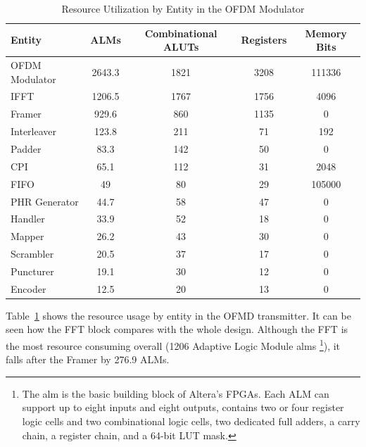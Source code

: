 \begin{table}[htb]\small
\centering
\caption{Resource Utilization by Entity in the OFDM Modulator}
\label{table:resource_entity_tx}
\begin{tabular}{lcccc}
\hline
Entity        & ALMs   & Combinational ALUTs & Registers & Memory Bits \\ \hline
OFDM Modulator       & 2643.3 & 1821                & 3208      & 111336      \\
IFFT          & 1206.5 & 1767                 &1756      & 4096        \\
Framer        & 929.6  & 860                 & 1135      & 0           \\
Interleaver   & 123.8  & 211                 & 71        & 192         \\
Padder        & 83.3   & 142                 & 50        & 0           \\
CPI           & 65.1   & 112                 & 31        & 2048        \\
FIFO          & 49     & 80                  & 29        & 105000      \\
PHR Generator & 44.7   & 58                  & 47        & 0           \\
Handler       & 33.9   & 52                  & 18        & 0           \\
Mapper        & 26.2   & 43                  & 30        & 0           \\
Scrambler     & 20.5   & 37                  & 17        & 0           \\
Puncturer     & 19.1   & 30                  & 12        & 0           \\
Encoder       & 12.5   & 20                  & 13        & 0          \\ \hline

\end{tabular}
\end{table}


 Table~\ref{table:resource_entity_tx} shows the resource usage by entity in the OFMD transmitter. It can be seen how the FFT block compares with the whole design. Although the FFT is the most resource consuming overall (1206 Adaptive Logic Module \ac{alm}s \footnote{The \ac{alm} is the basic building block of Altera's FPGAs. Each ALM can support up to eight inputs and eight outputs, contains two or four register logic cells and two combinational logic cells, two dedicated full adders, a carry chain, a register chain, and a 64-bit LUT mask.\cite{altera_wp_alm}}), it falls after the Framer by 276.9 ALMs.
 
